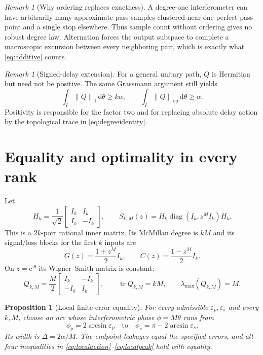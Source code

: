 \documentclass[11pt]{article}
\newtheorem{proposition}[theorem]{Proposition}
\theoremstyle{definition}
\theoremstyle{remark}
\newtheorem{remark}[theorem]{Remark}
\newcommand{\diag}{\operatorname{diag}}
\newcommand{\tr}{\operatorname{tr}}
\newcommand{\dd}{\mathrm{d}}
\newcommand{\e}{\mathrm{e}}
\newcommand{\snorm}[1]{\left\lVert#1\right\rVert_1}
\newcommand{\onorm}[1]{\left\lVert#1\right\rVert_{\mathrm{op}}}
\begin{document}
\begin{remark}[Why ordering replaces exactness]
A degree-one interferometer can have arbitrarily many approximate pass
samples clustered near one perfect pass point and a single stop elsewhere.
Thus sample count without ordering gives no robust degree law.  Alternation
forces the output subspace to complete a macroscopic excursion between every
neighboring pair, which is exactly what \eqref{eq:additive} counts.
\end{remark}

\begin{remark}[Signed-delay extension]
For a general unitary path, $Q$ is Hermitian but need not be positive.  The
same Grassmann argument still yields
\[
 \int_I\snorm{Q}\,\dd\theta\geq k\alpha,
 \qquad
 \int_I\onorm{Q}\,\dd\theta\geq\alpha.
\]
Positivity is responsible for the factor two and for replacing absolute
delay action by the topological trace in \eqref{eq:degreeidentity}.
\end{remark}

\section{Equality and optimality in every rank}

Let
\begin{equation}\label{eq:H}
 H_k=\frac{1}{\sqrt2}
 \begin{bmatrix}I_k&I_k\\I_k&-I_k\end{bmatrix},
 \qquad
 S_{k,M}(z)=H_k\diag(I_k,z^MI_k)H_k.
\end{equation}
This is a $2k$-port rational inner matrix.  Its McMillan degree is $kM$ and
its signal/loss blocks for the first $k$ inputs are
\begin{equation}\label{eq:explicitblocks}
 G(z)=\frac{1+z^M}{2}I_k,
 \qquad
 C(z)=\frac{1-z^M}{2}I_k.
\end{equation}
On $z=\e^{\mathrm{i}\theta}$ its Wigner--Smith matrix is constant:
\begin{equation}\label{eq:explicitQ}
 Q_{k,M}=\frac{M}{2}
 \begin{bmatrix}I_k&-I_k\\-I_k&I_k\end{bmatrix},
 \qquad
 \tr Q_{k,M}=kM,
 \qquad
 \lambda_{\max}(Q_{k,M})=M.
\end{equation}

\begin{proposition}[Local finite-error equality]\label{prop:localequality}
For every admissible $\varepsilon_p,\varepsilon_s$ and every $k,M$, choose
an arc whose interferometric phase $\phi=M\theta$ runs from
\[
 \phi_p=2\arcsin\varepsilon_p
 \quad\text{to}\quad
 \phi_s=\pi-2\arcsin\varepsilon_s.
\]
Its width is $\Delta=2\alpha/M$.  The endpoint leakages equal the specified
errors, and all four inequalities in \eqref{eq:localaction}--\eqref{eq:localpeak}
hold with equality.
\end{proposition}
\end{document}
